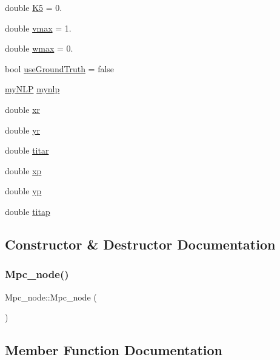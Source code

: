 \begin{DoxyCompactItemize}
double \hyperlink{classMpc__node_a893fd885d574e00cbe38cbcd06079aca}{K5} = 0.
\item 
double \hyperlink{classMpc__node_a1d0e857050592ddf6afa764a74a03f4a}{vmax} = 1.
\item 
double \hyperlink{classMpc__node_a85d68b460b951590985a52dabdb0ba4b}{wmax} = 0.
\item 
bool \hyperlink{classMpc__node_a4ac01e38cecc492097d9fabd33afab8d}{use\+Ground\+Truth} = false
\item 
\hyperlink{classmyNLP}{my\+N\+LP} \hyperlink{classMpc__node_a5a7534e2aaa1e1003d4c710589e07590}{mynlp}
\item 
double \hyperlink{classMpc__node_a5e3e13f0270d4e8c3555c60a3a9b5356}{xr}
\item 
double \hyperlink{classMpc__node_a93c8464ce2e0446c7463bad6a52ee8a1}{yr}
\item 
double \hyperlink{classMpc__node_a78f2cb060ecee1c0be22b9b59fb0638e}{titar}
\item 
double \hyperlink{classMpc__node_aeb6d97153be787995ddefaa9839e09c0}{xp}
\item 
double \hyperlink{classMpc__node_adb9780e9f20aa698a68fbc632b8e4f46}{yp}
\item 
double \hyperlink{classMpc__node_ad599feb3182645b6359b6bb16055fcb8}{titap}
\end{DoxyCompactItemize}


\subsection{Constructor \& Destructor Documentation}
\mbox{\label{classMpc__node_aecd75162dde3b8750c37e0b85a036097}} 
\subsubsection{\texorpdfstring{Mpc\+\_\+node()}{Mpc\_node()}}
{\footnotesize\ttfamily Mpc\+\_\+node\+::\+Mpc\+\_\+node (\begin{DoxyParamCaption}{ }\end{DoxyParamCaption})}



\subsection{Member Function Documentation}
\mbox{\label{classMpc__node_ab55c31f17c32c247adbcee5aae40c128}} 
